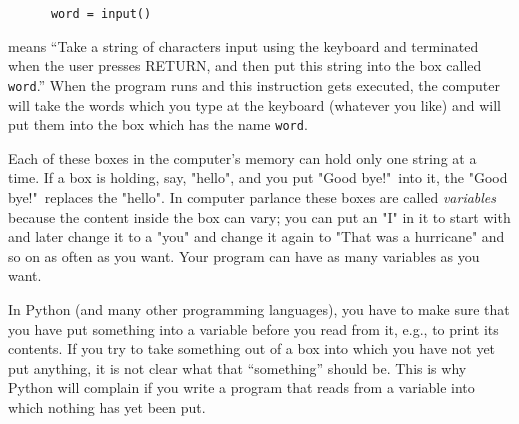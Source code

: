 \begin{Verbatim}
      word = input()
\end{Verbatim}

means ``Take a string of characters input using the keyboard and
terminated when the user presses RETURN, and
then put this string into the box called \verb!word!.''  When the program runs and
this instruction gets executed, the computer will take the words which
you type at the keyboard (whatever you like) and will put them into
the box which has the name \verb!word!.

Each of these boxes in the computer's memory can hold only one string at a time.  If a box is
holding, say, "hello", and you put "Good bye!"\ into it, the
"Good bye!"\ replaces the "hello".  In computer parlance these
boxes are called \emph{variables} because the content inside the box
can vary; you can put an "I" in it to start with and later change it
to a "you" and change it again to "That was a hurricane" and so on
as often as you want.
Your program can have as many variables as you want.


%
%
%
%
%
In Python (and many other programming languages), you have to make sure
that you have put something into a variable before you read from it,
e.g., to print its contents. If you try to take something out of a box
into which you have not yet put anything, it is not clear what that
``something'' should be. This is why Python will complain if you write
a program that reads from a variable into which nothing has yet been put.



